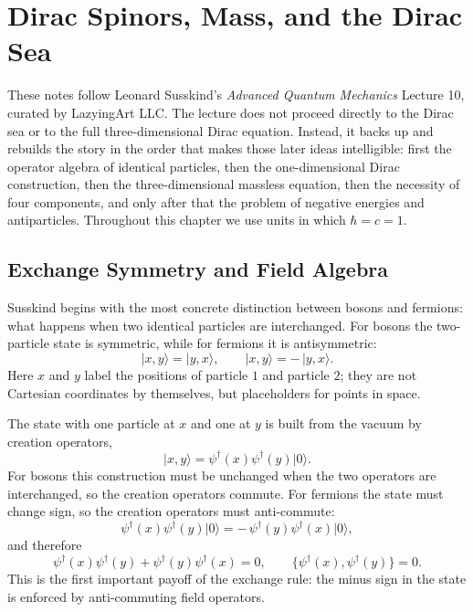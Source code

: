 \chapter{Dirac Spinors, Mass, and the Dirac Sea}

These notes follow Leonard Susskind's \emph{Advanced Quantum Mechanics} Lecture 10, curated by LazyingArt LLC. The lecture does not proceed directly to the Dirac sea or to the full three-dimensional Dirac equation. Instead, it backs up and rebuilds the story in the order that makes those later ideas intelligible: first the operator algebra of identical particles, then the one-dimensional Dirac construction, then the three-dimensional massless equation, then the necessity of four components, and only after that the problem of negative energies and antiparticles. Throughout this chapter we use units in which \(\hbar=c=1\).

\section{Exchange Symmetry and Field Algebra}

Susskind begins with the most concrete distinction between bosons and fermions: what happens when two identical particles are interchanged. For bosons the two-particle state is symmetric, while for fermions it is antisymmetric:
\begin{equation}
\lvert x,y\rangle=\lvert y,x\rangle,
\qquad
\lvert x,y\rangle=-\,\lvert y,x\rangle.
\end{equation}
Here \(x\) and \(y\) label the positions of particle \(1\) and particle \(2\); they are not Cartesian coordinates by themselves, but placeholders for points in space.

The state with one particle at \(x\) and one at \(y\) is built from the vacuum by creation operators,
\begin{equation}
\lvert x,y\rangle=\psi^\dagger(x)\psi^\dagger(y)\lvert 0\rangle.
\end{equation}
For bosons this construction must be unchanged when the two operators are interchanged, so the creation operators commute. For fermions the state must change sign, so the creation operators must anti-commute:
\begin{equation}
\psi^\dagger(x)\psi^\dagger(y)\lvert 0\rangle
=
-\,\psi^\dagger(y)\psi^\dagger(x)\lvert 0\rangle,
\end{equation}
and therefore
\begin{equation}
\psi^\dagger(x)\psi^\dagger(y)+\psi^\dagger(y)\psi^\dagger(x)=0,
\qquad
\{\psi^\dagger(x),\psi^\dagger(y)\}=0.
\end{equation}
This is the first important payoff of the exchange rule: the minus sign in the state is enforced by anti-commuting field operators.

